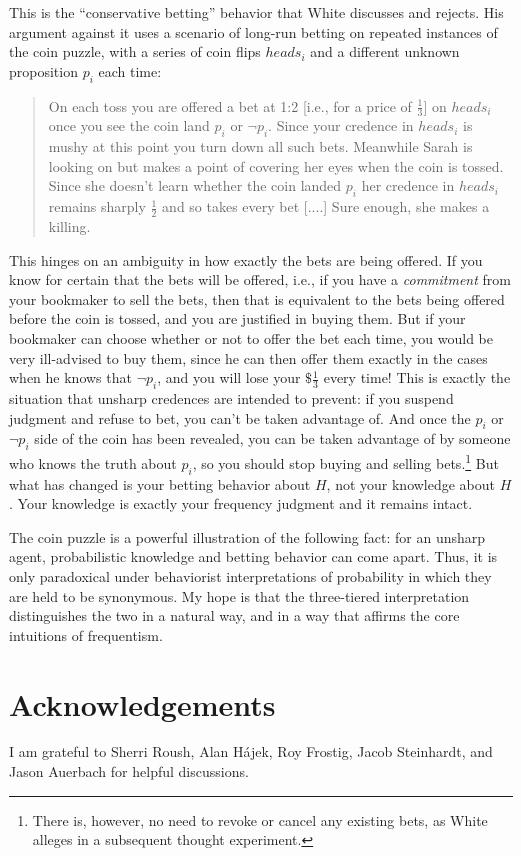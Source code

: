 \documentclass[letterpaper,12pt]{article}
\newcommand{\hajek}{H\'ajek}
\begin{document}
This is the ``conservative betting'' behavior that White discusses and rejects. His argument against it uses a scenario of long-run betting on repeated instances of the coin puzzle, with a series of coin flips $\mathit{heads}_i$ and a different unknown proposition $p_i$ each time:

\begin{quotation}
On each toss you are offered a bet at 1:2 [i.e., for a price of $\frac{1}{3}$] on $\mathit{heads}_i$ once you see the coin land $p_i$ or $\neg p_i$. Since your credence in $\mathit{heads}_i$ is mushy at this point you turn down all such bets. Meanwhile Sarah is looking on but makes a point of covering her eyes when the coin is tossed. Since she doesn't learn whether the coin landed $p_i$ her credence in $\mathit{heads}_i$ remains sharply $\frac{1}{2}$ and so takes every bet [....] Sure enough, she makes a killing.
\end{quotation}

This hinges on an ambiguity in how exactly the bets are being offered. If you know for certain that the bets will be offered, i.e., if you have a \emph{commitment} from your bookmaker to sell the bets, then that is equivalent to the bets being offered before the coin is tossed, and you are justified in buying them. But if your bookmaker can choose whether or not to offer the bet each time, you would be very ill-advised to buy them, since he can then offer them exactly in the cases when he knows that $\neg p_i$, and you will lose your $\$\frac{1}{3}$ every time! This is exactly the situation that unsharp credences are intended to prevent: if you suspend judgment and refuse to bet, you can't be taken advantage of. And once the $p_i$ or $\neg p_i$ side of the coin has been revealed, you can be taken advantage of by someone who knows the truth about $p_i$, so you should stop buying and selling bets.\footnote{There is, however, no need to revoke or cancel any existing bets, as White alleges in a subsequent thought experiment.} But what has changed is your betting behavior about $H$, not your knowledge about $H$. Your knowledge is exactly your frequency judgment and it remains intact.

The coin puzzle is a powerful illustration of the following fact: for an unsharp agent, probabilistic knowledge and betting behavior can come apart. Thus, it is only paradoxical under behaviorist interpretations of probability in which they are held to be synonymous. My hope is that the three-tiered interpretation distinguishes the two in a natural way, and in a way that affirms the core intuitions of frequentism.


\section{Acknowledgements}
I am grateful to Sherri Roush, Alan \hajek, Roy Frostig, Jacob Steinhardt, and Jason Auerbach for helpful discussions.


\end{document}
